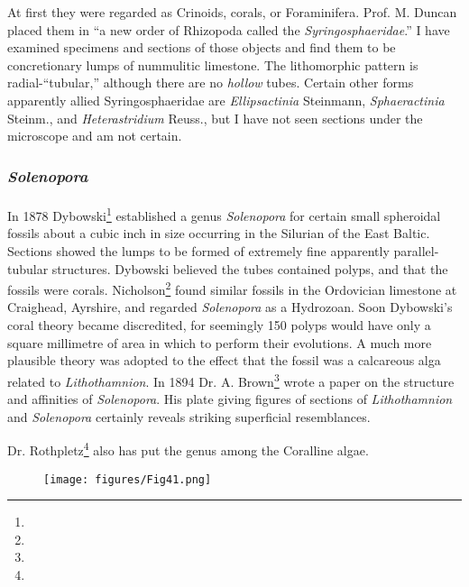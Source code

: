 \documentclass[a4paper, 12pt, oneside]{article}
\begin{document}
At first they were regarded as Crinoids, corals, or Foraminifera. Prof. M. Duncan placed them in ``a new order of Rhizopoda called the \emph{Syringosphaeridae}.'' I have examined specimens and sections of those objects and find them to be concretionary lumps of nummulitic limestone. The lithomorphic pattern is radial-``tubular,'' although there are no \emph{hollow} tubes. Certain other forms apparently allied Syringosphaeridae are \emph{Ellipsactinia} Steinmann, \emph{Sphaeractinia} Steinm., and \emph{Heterastridium} Reuss., but I have not seen sections under the microscope and am not certain.

\subsubsection{\emph{Solenopora}}
\paragraph{}
In 1878 Dybowski\footnote{} established a genus \emph{Solenopora} for certain small spheroidal fossils about a cubic inch in size occurring in the Silurian of the East Baltic. Sections showed the lumps to be formed of extremely fine apparently parallel-tubular structures. Dybowski believed the tubes contained polyps, and that the fossils were corals. Nicholson\footnote{} found similar fossils in the Ordovician limestone at Craighead, Ayrshire, and regarded \emph{Solenopora} as a Hydrozoan. Soon Dybowski's coral theory became discredited, for seemingly 150 polyps would have only a square millimetre of area in which to perform their evolutions. A much more plausible theory was adopted to the effect that the fossil was a calcareous alga related to \emph{Lithothamnion}. In 1894 Dr. A. Brown\footnote{} wrote a paper on the structure and affinities of \emph{Solenopora}. His plate giving figures of sections of \emph{Lithothamnion} and \emph{Solenopora} certainly reveals striking superficial resemblances.

Dr. Rothpletz\footnote{} also has put the genus among the Coralline algae.
\begin{figure}[H]
\centering
\texttt{[image: figures/Fig41.png]}
\caption*{}
\end{figure}
\end{document}
